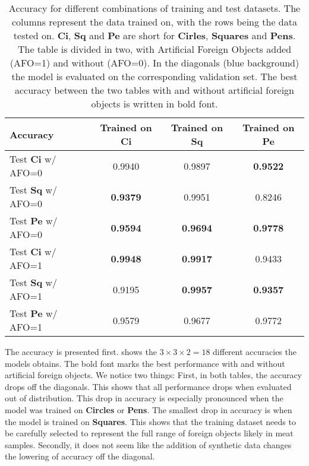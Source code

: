 \begin{table}
	\begin{tabular}{l|ccc}
		\hline
		Accuracy	& Trained on \textbf{Ci} &   Trained on \textbf{Sq} &   Trained on \textbf{Pe} \\
		\hline
		Test \textbf{Ci} w/ AFO=0 & \cellcolor{pblue!25} 0.9940 &        0.9897 &        \textbf{0.9522} \\
		Test \textbf{Sq} w/ AFO=0 & \textbf{0.9379} &        \cellcolor{pblue!25} 0.9951 &        0.8246 \\
		Test \textbf{Pe} w/ AFO=0 & \textbf{0.9594} &        \textbf{0.9694} &        \cellcolor{pblue!25} \textbf{0.9778} \\
		\hline
		Test \textbf{Ci} w/ AFO=1 & \cellcolor{pblue!25} \textbf{0.9948} &        \textbf{0.9917} &        0.9433 \\
		Test \textbf{Sq} w/ AFO=1 & 0.9195 &        \cellcolor{pblue!25} \textbf{0.9957} &        \textbf{0.9357} \\
		Test \textbf{Pe} w/ AFO=1 & 0.9579 &        0.9677 &        \cellcolor{pblue!25} 0.9772 \\
		\hline
	\end{tabular}
	\caption{Accuracy for different combinations of training and test datasets. The columns represent the data trained on, with the rows being the data tested on. \textbf{Ci}, \textbf{Sq} and \textbf{Pe} are short for \textbf{Cirles}, \textbf{Squares} and \textbf{Pens}.
	The table is divided in two, with Artificial Foreign Objects added 
	(AFO=1) and without (AFO=0). 
	In the diagonals (blue background) the model is evaluated on the corresponding validation set. 
	The best accuracy between the two tables with and without artificial foreign objects is written in bold font.}
	\label{tab:afo_acc}
\end{table}

The accuracy is presented first.
 shows the $3 \times 3 \times 2 = 18$ different accuracies the models obtains. The bold font marks the best performance with and without artificial foreign objects. 
We notice two things: First, in both tables, the accuracy drops off the diagonals. This shows that all performance drops when evaluated out of distribution.
This drop in accuracy is especially pronounced when the model was trained on \textbf{Circles} or \textbf{Pens}. The smallest drop in accuracy is when the model is trained on \textbf{Squares}. 
This shows that the training dataset needs to be carefully selected to represent the full range of foreign objects likely in meat samples.
Secondly, it does not seem like the addition of synthetic data changes the lowering of accuracy off the diagonal. 

